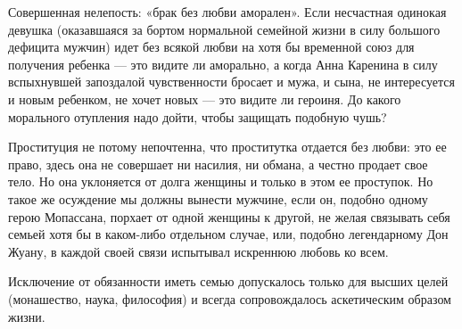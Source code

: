 Совершенная нелепость: «брак без любви аморален». Если несчастная
одинокая девушка (оказавшаяся за бортом нормальной семейной жизни в
силу большого дефицита мужчин) идет без всякой любви на хотя бы
временной союз для получения ребенка --- это видите ли аморально, а
когда Анна Каренина в силу вспыхнувшей запоздалой чувственности
бросает и мужа, и сына, не интересуется и новым ребенком, не хочет
новых --- это видите ли героиня. До какого морального отупления надо
дойти, чтобы защищать подобную чушь?

Проституция не потому непочтенна, что проститутка отдается без любви:
это ее право, здесь она не совершает ни насилия, ни обмана, а честно
продает свое тело. Но она уклоняется от долга женщины и только в этом
ее проступок. Но такое же осуждение мы должны вынести мужчине, если
он, подобно одному герою Мопассана, порхает от одной женщины к другой,
не желая связывать себя семьей хотя бы в каком-либо отдельном случае,
или, подобно легендарному Дон Жуану, в каждой своей связи испытывал
искреннюю любовь ко всем.

Исключение от обязанности иметь семью допускалось только для высших
целей (монашество, наука, философия) и всегда сопровождалось
аскетическим образом жизни.

